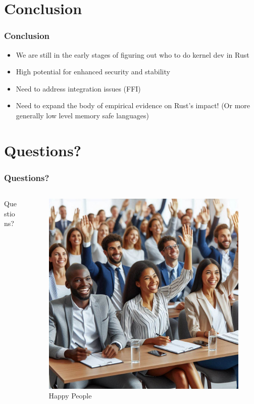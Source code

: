 \documentclass{beamer}
\begin{document}
\section{Conclusion}

\begin{frame}
  \frametitle{Conclusion}
  \begin{itemize}
  \item<1-> We are still in the early stages of figuring out who to do kernel dev in Rust
  \item<2-> High potential for enhanced security and stability
  \item<3-> Need to address integration issues (FFI)
  \item<4-> Need to expand the body of empirical evidence on Rust's impact! (Or more generally low
    level memory safe languages)
  \end{itemize}

\end{frame}

\section{Questions?}

\begin{frame}
  \frametitle{Questions?}
  \begin{columns}
    \begin{column}{0.5\textwidth}
      Questions?
    \end{column}
    \begin{column}{0.5\textwidth}
      \begin{figure}
        \caption{Happy People\footnotemark[1]}
        \includegraphics[width=.8\textwidth]{images/questions.jpeg}\footnotemark[1]
      \end{figure}
    \end{column}
  \end{columns}
\end{frame}
\end{document}
